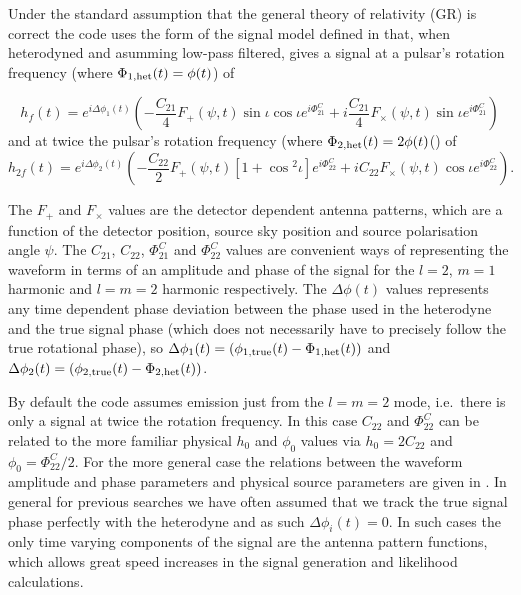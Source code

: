 \documentclass[aps,prd,showpacs,superscriptaddress,twocolumn,preprintnumbers,altaffilletter]{revtex4-1}
\begin{document}
Under the standard assumption that the general theory of relativity (GR) is correct the code uses the form of
the signal model defined in \cite{2015arXiv150105832J} that, when heterodyned and asumming low-pass
filtered, gives a signal at a pulsar's rotation frequency (where $\Phi_{1,{\rm het}}(t) = \phi(t)$) of
\begin{widetext}
\begin{equation}\label{eq:hf}
h_f(t) =  e^{i\Delta\phi_1(t)}\left(-\frac{C_{21}}{4}F_{+}(\psi,t)\sin{\iota}\cos{\iota}e^{i\Phi_{21}^C} +
i\frac{C_{21}}{4}F_{\times}(\psi,t)\sin{\iota}e^{i\Phi_{21}^C} \right)
\end{equation}
and at twice the pulsar's rotation frequency (where $\Phi_{2,{\rm het}}(t) = 2\phi(t)$() of
\begin{equation}\label{eq:h2f}
h_{2f}(t) =  e^{i\Delta\phi_2(t)}\left(-\frac{C_{22}}{2}F_{+}(\psi,t)[1+\cos{}^2\iota]e^{i\Phi_{22}^C} +
iC_{22}F_{\times}(\psi,t)\cos{\iota}e^{i\Phi_{22}^C} \right).
\end{equation}
\end{widetext}
The $F_{+}$ and $F_{\times}$ values are the detector dependent antenna patterns, which are a function of the
detector position, source sky position and source polarisation angle $\psi$. The $C_{21}$, $C_{22}$,
$\Phi_{21}^C$ and $\Phi_{22}^C$ values are convenient ways of representing the waveform in terms of an
amplitude and phase of the signal for the $l=2$, $m=1$ harmonic and $l=m=2$ harmonic respectively. The
$\Delta\phi(t)$ values represents any time dependent phase deviation between the phase used in the heterodyne
and the true signal phase (which does not necessarily have to precisely follow the true rotational phase), so
$\Delta\phi_1(t) = (\phi_{1,{\rm true}}(t)-\Phi_{1,{\rm het}}(t))$ and $\Delta\phi_2(t) = (\phi_{2,{\rm
true}}(t)-\Phi_{2,{\rm het}}(t))$.

By default the code assumes emission just from the $l=m=2$ mode, i.e.\ there is only a signal at twice the
rotation frequency. In this case $C_{22}$ and $\Phi_{22}^C$ can be related to the more familiar physical
$h_0$ and $\phi_0$ values via $h_0 = 2C_{22}$ and $\phi_0 = \Phi_{22}^C/2$. For the more general case the
relations between the waveform amplitude and phase parameters and physical source parameters are given in
\cite{2015arXiv150105832J}. In general for previous searches we have often assumed that we track the true
signal phase perfectly with the heterodyne and as such $\Delta\phi_i(t) = 0$. In such cases the only time
varying components of the signal are the antenna pattern functions, which allows great speed increases in the
signal generation and likelihood calculations.
\end{document}
